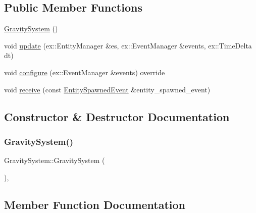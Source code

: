 \subsection*{Public Member Functions}
\begin{DoxyCompactItemize}
\item 
\hyperlink{classGravitySystem_adf52a6e69ad42c81ebfe551093897bfc}{Gravity\+System} ()
\item 
void \hyperlink{classGravitySystem_a96d2addda17d0405ec82a1c6beb57b7a}{update} (ex\+::\+Entity\+Manager \&es, ex\+::\+Event\+Manager \&events, ex\+::\+Time\+Delta dt)
\item 
void \hyperlink{classGravitySystem_af53475dc43da2c55b71875ddb1f6bda5}{configure} (ex\+::\+Event\+Manager \&events) override
\item 
void \hyperlink{classGravitySystem_a9ccb1aae9dfbcbdd6c12a286010deddd}{receive} (const \hyperlink{classEntitySpawnedEvent}{Entity\+Spawned\+Event} \&entity\+\_\+spawned\+\_\+event)
\end{DoxyCompactItemize}


\subsection{Constructor \& Destructor Documentation}
\mbox{\label{classGravitySystem_adf52a6e69ad42c81ebfe551093897bfc}} 
\subsubsection{\texorpdfstring{Gravity\+System()}{GravitySystem()}}
{\footnotesize\ttfamily Gravity\+System\+::\+Gravity\+System (\begin{DoxyParamCaption}{ }\end{DoxyParamCaption})\hspace{0.3cm}{\ttfamily [inline]}, {\ttfamily [explicit]}}



\subsection{Member Function Documentation}
\mbox{\label{classGravitySystem_af53475dc43da2c55b71875ddb1f6bda5}} 

